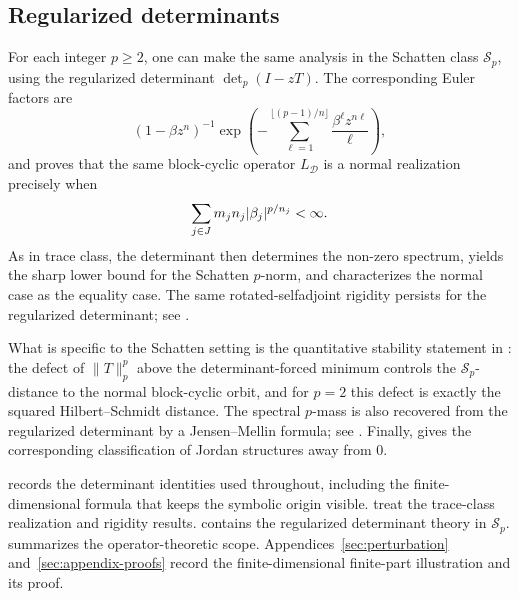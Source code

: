 \subsection{Regularized determinants}

For each integer \(p\ge 2\), one can make the same analysis in the
Schatten class \(\mathcal S_p\), using the regularized determinant
\(\det_p(I-zT)\). The corresponding Euler factors are
\[
  (1-\beta z^n)^{-1}
  \exp\!\left(
    -\sum_{\ell=1}^{\lfloor (p-1)/n\rfloor}\frac{\beta^\ell z^{n\ell}}{\ell}
  \right),
\]
and  proves that the same block-cyclic
operator \(L_{\mathcal D}\) is a normal realization precisely when
\[
  \sum_{j\in J}m_j n_j\lvert \beta_j \rvert^{p/n_j}<\infty.
\]
As in trace class, the determinant then determines the non-zero
spectrum, yields the sharp lower bound for the Schatten \(p\)-norm, and
characterizes the normal case as the equality case. The same
rotated-selfadjoint rigidity persists for the regularized determinant;
see .

What is specific to the Schatten setting is the quantitative stability
statement in : the defect of
\(\|T\|_p^p\) above the determinant-forced minimum controls the
\(\mathcal S_p\)-distance to the normal block-cyclic orbit, and for
\(p=2\) this defect is exactly the squared Hilbert--Schmidt distance.
The spectral \(p\)-mass is also recovered from the regularized determinant
by a Jensen--Mellin formula; see . Finally,
 gives the corresponding classification of
Jordan structures away from \(0\).

 records the determinant identities used
throughout, including the finite-dimensional formula that keeps the
symbolic origin visible.  treat the
trace-class realization and rigidity results. 
contains the regularized determinant theory in \(\mathcal S_p\).
 summarizes the operator-theoretic scope.
Appendices~\ref{sec:perturbation} and~\ref{sec:appendix-proofs} record
the finite-dimensional finite-part illustration and its proof.
